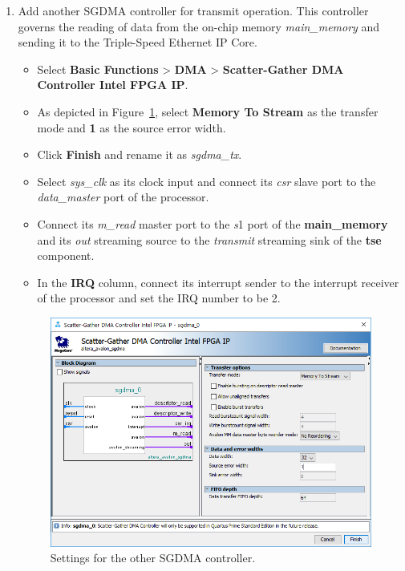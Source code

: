 \documentclass[11pt, twoside, pdftex]{article}
\begin{document}
\begin{enumerate}
	\item Add another SGDMA controller for transmit operation. This controller governs the reading of data from the on-chip memory {\it main\_memory} and sending it to the Triple-Speed Ethernet IP Core. 
		\begin{itemize}
			\item Select {\bf Basic Functions} > {\bf DMA} > {\bf Scatter-Gather DMA Controller Intel FPGA IP}. 
			\item As depicted in Figure~\ref{fig:sgdma_settings2}, select {\bf Memory To Stream} as the transfer mode and {\bf 1} as the source error width. 
			\item Click {\bf Finish} and rename it as {\it sgdma\_tx}.
			\item Select {\it sys\_clk} as its clock input and connect its {\it csr} slave port to the {\it data\_master} port of the processor.
			\item Connect its {\it m\_read} master port to the {\it s}1 port of the {\bf main\_memory} and its {\it out} streaming source to the {\it transmit} streaming sink of the {\bf tse} component. 
			\item In the {\bf IRQ} column, connect its interrupt sender to the interrupt receiver of the processor and set the IRQ number to be 2. 
		\end{itemize}

		\begin{figure}[H]
			\centering
			  \includegraphics[scale=0.65]{figures/sgdma_settings2.png}
			\caption{Settings for the other SGDMA controller.} 
			\label{fig:sgdma_settings2}
		\end{figure}
	

\end{enumerate}
\end{document}
